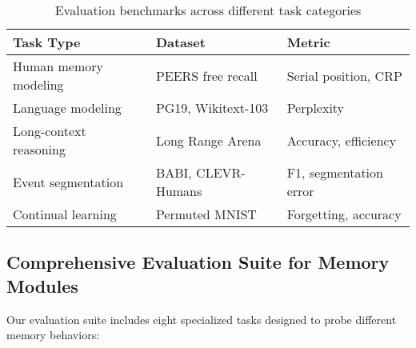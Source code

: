 \documentclass[11pt]{article}
\begin{document}
\begin{table}[h]
\centering
\begin{tabular}{@{}lll@{}}
\toprule
\textbf{Task Type} & \textbf{Dataset} & \textbf{Metric} \\
\midrule
Human memory modeling & PEERS free recall & Serial position, CRP \\
Language modeling & PG19, Wikitext-103 & Perplexity \\
Long-context reasoning & Long Range Arena & Accuracy, efficiency \\
Event segmentation & BABI, CLEVR-Humans & F1, segmentation error \\
Continual learning & Permuted MNIST & Forgetting, accuracy \\
\bottomrule
\end{tabular}
\caption{Evaluation benchmarks across different task categories}
\label{tab:benchmarks}
\end{table}

\subsection{Comprehensive Evaluation Suite for Memory Modules}

Our evaluation suite includes eight specialized tasks designed to probe different memory behaviors:
\end{document}
